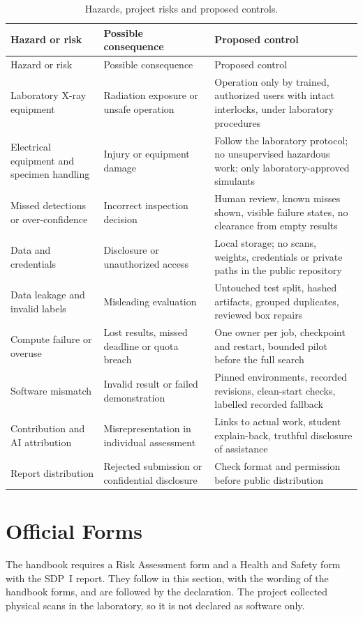 \begingroup\tablesetup
\begin{longtable}{@{}L{0.22\textwidth}L{0.27\textwidth}L{0.45\textwidth}@{}}
\caption{Hazards, project risks and proposed controls.}\label{tab:risk}\\
\toprule Hazard or risk & Possible consequence & Proposed control\\\midrule\endfirsthead
\toprule Hazard or risk & Possible consequence & Proposed control\\\midrule\endhead
Laboratory X-ray equipment & Radiation exposure or unsafe operation & Operation
only by trained, authorized users with intact interlocks, under laboratory
procedures\\
Electrical equipment and specimen handling & Injury or equipment damage & Follow the
laboratory protocol; no unsupervised hazardous work; only laboratory-approved
simulants\\
Missed detections or over-confidence & Incorrect inspection decision & Human
review, known misses shown, visible failure states, no clearance from empty
results\\
Data and credentials & Disclosure or unauthorized access & Local storage; no scans,
weights, credentials or private paths in the public repository\\
Data leakage and invalid labels & Misleading evaluation & Untouched test split,
hashed artifacts, grouped duplicates, reviewed box repairs\\
Compute failure or overuse & Lost results, missed deadline or quota breach & One
owner per job, checkpoint and restart, bounded pilot before the full search\\
Software mismatch & Invalid result or failed demonstration & Pinned environments,
recorded revisions, clean-start checks, labelled recorded fallback\\
Contribution and AI attribution & Misrepresentation in individual assessment &
Links to actual work, student explain-back, truthful disclosure of assistance\\
Report distribution & Rejected submission or confidential disclosure & Check
format and permission before public distribution\\
\bottomrule
\end{longtable}
\endgroup

\section{Official Forms}\label{sec:forms}
The handbook requires a Risk Assessment form and a Health and Safety form with the
SDP~I report. They follow in this section, with the wording of the handbook forms, and are
followed by the declaration. The project collected physical scans in the laboratory, so
it is not declared as software only.

